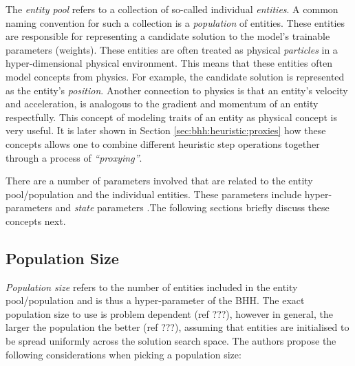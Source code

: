 The \textit{entity pool} refers to a collection of so-called individual \textit{entities}. A common naming convention for such a collection is a \textit{population} of entities. These entities are responsible for representing a candidate solution to the model's trainable parameters (weights). These entities are often  treated as physical \textit{particles} in a hyper-dimensional  physical environment. This means that these entities often model concepts from physics. For example, the candidate solution is represented as the entity's \textit{position}. Another connection to physics is that an entity's velocity and acceleration, is analogous to the gradient and momentum of an entity respectfully. This concept of modeling traits of an entity as physical concept is very useful. It is later shown in Section \ref{sec:bhh:heuristic:proxies} how these concepts allows one to combine different heuristic step operations together through a process of \textit{``proxying''}.

There are a number of parameters involved that are related to the entity pool/population and the individual entities. These parameters include hyper-parameters and \textit{state} parameters .The following sections briefly discuss these concepts next.

\subsection{Population Size}
\label{sec:bhh:entity_pool:population_size}

\textit{Population size} refers to the number of entities included in the entity pool/population and is thus a hyper-parameter of the \Ac{BHH}. The exact population size to use is problem dependent (ref ???), however in general, the larger the population the better (ref ???), assuming that entities are initialised to be spread uniformly across the solution search space. The authors propose the following considerations when picking a population size:

